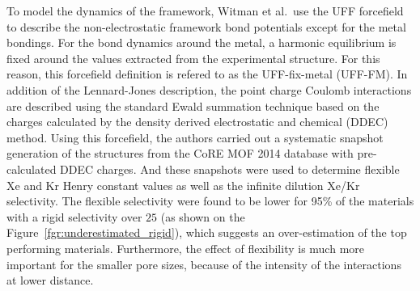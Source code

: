 \documentclass[main]{subfiles}
\begin{document}
To model the dynamics of the framework, Witman et al.\ use the UFF forcefield to describe the non-electrostatic framework bond potentials except for the metal bondings. For the bond dynamics around the metal, a harmonic equilibrium is fixed around the values extracted from the experimental structure. For this reason, this forcefield definition is refered to as the UFF-fix-metal (UFF-FM). In addition of the Lennard-Jones description, the point charge Coulomb interactions are described using the standard Ewald summation technique based on the charges calculated by the density derived electrostatic and chemical (DDEC) method.\autocite{manz2010chemically} Using this forcefield, the authors carried out a systematic snapshot generation of the structures from the CoRE MOF 2014 database with pre-calculated DDEC charges. And these snapshots were used to determine flexible Xe and Kr Henry constant values as well as the infinite dilution Xe/Kr selectivity. The flexible selectivity were found to be lower for {95\%} of the materials with a rigid selectivity over $25$ (as shown on the Figure~\ref{fgr:underestimated_rigid}), which suggests an over-estimation of the top performing materials. Furthermore, the effect of flexibility is much more important for the smaller pore sizes, because of the intensity of the interactions at lower distance. 
\end{document}
